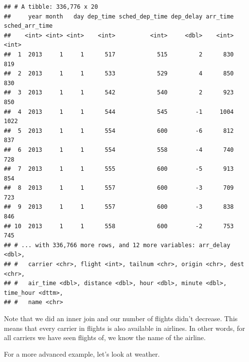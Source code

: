\documentclass[]{tufte-book}
\newenvironment{Shaded}{}{}
\newcommand{\KeywordTok}[1]{\textcolor[rgb]{0.00,0.44,0.13}{\textbf{#1}}}
\newcommand{\NormalTok}[1]{#1}
\newcommand{\OperatorTok}[1]{\textcolor[rgb]{0.40,0.40,0.40}{#1}}
\newcommand{\StringTok}[1]{\textcolor[rgb]{0.25,0.44,0.63}{#1}}
\begin{document}
\begin{Shaded}
\end{Shaded}

\begin{verbatim}
## # A tibble: 336,776 x 20
##     year month   day dep_time sched_dep_time dep_delay arr_time sched_arr_time
##    <int> <int> <int>    <int>          <int>     <dbl>    <int>          <int>
##  1  2013     1     1      517            515         2      830            819
##  2  2013     1     1      533            529         4      850            830
##  3  2013     1     1      542            540         2      923            850
##  4  2013     1     1      544            545        -1     1004           1022
##  5  2013     1     1      554            600        -6      812            837
##  6  2013     1     1      554            558        -4      740            728
##  7  2013     1     1      555            600        -5      913            854
##  8  2013     1     1      557            600        -3      709            723
##  9  2013     1     1      557            600        -3      838            846
## 10  2013     1     1      558            600        -2      753            745
## # ... with 336,766 more rows, and 12 more variables: arr_delay <dbl>,
## #   carrier <chr>, flight <int>, tailnum <chr>, origin <chr>, dest <chr>,
## #   air_time <dbl>, distance <dbl>, hour <dbl>, minute <dbl>, time_hour <dttm>,
## #   name <chr>
\end{verbatim}

Note that we did an inner join and our number of flights didn't decrease. This means that every carrier in flights is also available in airlines. In other words, for all carriers we have seen flights of, we know the name of the airline.

For a more advanced example, let's look at weather.

\begin{Shaded}
\end{Shaded}
\end{document}
